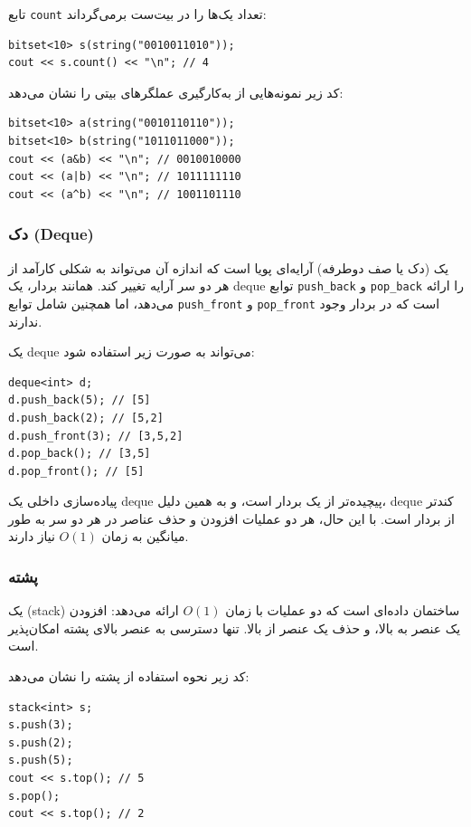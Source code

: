 تابع \texttt{count} تعداد یک‌ها را در بیت‌ست برمی‌گرداند:

\begin{lstlisting}
bitset<10> s(string("0010011010"));
cout << s.count() << "\n"; // 4
\end{lstlisting}

کد زیر نمونه‌هایی از به‌کارگیری عملگرهای بیتی را نشان می‌دهد:
\begin{lstlisting}
bitset<10> a(string("0010110110"));
bitset<10> b(string("1011011000"));
cout << (a&b) << "\n"; // 0010010000
cout << (a|b) << "\n"; // 1011111110
cout << (a^b) << "\n"; // 1001101110
\end{lstlisting}

\subsubsection{دک (Deque)}


یک  (دک یا صف دوطرفه) آرایه‌ای پویا است
که اندازه آن می‌تواند به شکلی کارآمد
از هر دو سر آرایه تغییر کند.
همانند بردار، یک deque توابع
\texttt{push\_back} و \texttt{pop\_back} را ارائه می‌دهد، اما
همچنین شامل توابع
\texttt{push\_front} و \texttt{pop\_front} است
که در بردار وجود ندارند.

یک deque می‌تواند به صورت زیر استفاده شود:
\begin{lstlisting}
deque<int> d;
d.push_back(5); // [5]
d.push_back(2); // [5,2]
d.push_front(3); // [3,5,2]
d.pop_back(); // [3,5]
d.pop_front(); // [5]
\end{lstlisting}

پیاده‌سازی داخلی یک deque
پیچیده‌تر از یک بردار است،
و به همین دلیل، deque کندتر از بردار است.
با این حال، هر دو عملیات افزودن و حذف
عناصر در هر دو سر به طور میانگین به زمان $O(1)$ نیاز دارند.

\subsubsection{پشته}


یک  (stack)
ساختمان داده‌ای است که دو عملیات
با زمان $O(1)$ ارائه می‌دهد:
افزودن یک عنصر به بالا،
و حذف یک عنصر از بالا.
تنها دسترسی به عنصر
بالای پشته امکان‌پذیر است.

کد زیر نحوه استفاده از پشته را نشان می‌دهد:
\begin{lstlisting}
stack<int> s;
s.push(3);
s.push(2);
s.push(5);
cout << s.top(); // 5
s.pop();
cout << s.top(); // 2
\end{lstlisting}
